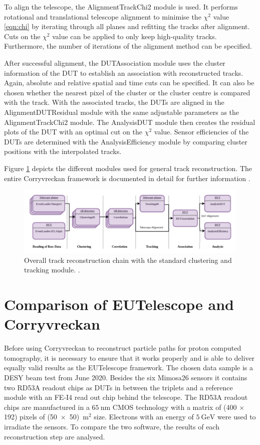 To align the telescope, the AlignmentTrackChi2 module is used. It performs rotational and translational telescope
alignment to minimise the $\chi^2$ value \ref{eqn:chi} by iterating through all planes and refitting the tracks after alignment. Cuts on the $\chi^2$ value can be
applied to only keep high-quality tracks. Furthermore, the number of iterations of the alignment method can be specified.

After successful alignment, the DUTAssociation module uses the cluster information of the DUT to establish an association with reconstructed tracks. Again, absolute
and relative spatial and time cuts can be specified. It can also be chosen whether the nearest pixel of the cluster or the cluster centre is compared with the track.
With the associated tracks, the DUTs are aligned in the AlignmentDUTResidual module with the same adjustable parameters as the AlignmentTrackChi2 module.
The AnalysisDUT module then creates the residual plots of the DUT with an optimal cut on the $\chi^2$ value. Sensor efficiencies of the DUTs are determined with the
AnalysisEfficiency module by comparing cluster positions with the interpolated tracks.


Figure \ref{fig:corry_track_reco} depicts
the different modules used for general track reconstruction. The entire Corryvreckan framework is documented in detail for further information \cite{corry_manual}.

\begin{figure}
  \centering
  \includegraphics[height=0.3\textwidth]{images/corry.png}
  \caption{Overall track reconstruction chain with the standard clustering and tracking module. \cite{corry_track_reco}.}
  \label{fig:corry_track_reco}
\end{figure}

\chapter{Comparison of EUTelescope and Corryvreckan}\label{make}
Before using Corryvreckan to reconstruct particle paths for proton computed tomography, it is necessary to ensure that it works properly
and is able to deliver equally valid results as the EUTelescope framework.
The chosen data sample is a DESY beam test from June 2020. Besides the six Mimosa26 sensors it contains two RD53A readout chips
as DUTs in between the triplets and a reference module with an FE-I4 read out chip behind the telescope. The RD53A readout chips are
manufactured in a $\SI{65}{\nano\meter}$ CMOS technology with a matrix of (400 $\times$ 192) pixels of
\mbox{(50 $\times$ 50) \textmu m$^2$} size. Electrons with an energy of $\SI{5}{\GeV}$ were used to irradiate the sensors.
To compare the two software, the results of each
reconstruction step are analysed. \\

